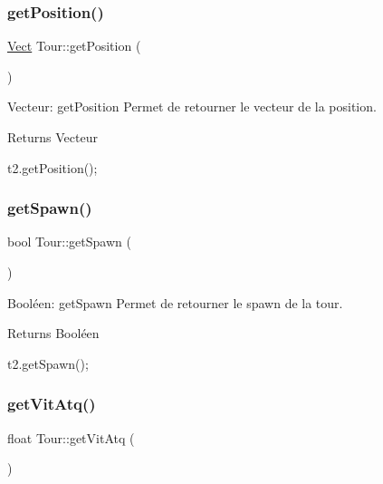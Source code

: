 \subsubsection{\texorpdfstring{get\+Position()}{getPosition()}}
{\footnotesize\ttfamily \hyperlink{classVect}{Vect} Tour\+::get\+Position (\begin{DoxyParamCaption}{ }\end{DoxyParamCaption})}



Vecteur\+: get\+Position Permet de retourner le vecteur de la position. 

\begin{DoxyReturn}{Returns}
Vecteur 
\begin{DoxyCode}
t2.getPosition();
\end{DoxyCode}
 
\end{DoxyReturn}
\mbox{\label{classTour_ae71fadbf5144610f0cc6a0e0b78386bb}} 
\subsubsection{\texorpdfstring{get\+Spawn()}{getSpawn()}}
{\footnotesize\ttfamily bool Tour\+::get\+Spawn (\begin{DoxyParamCaption}{ }\end{DoxyParamCaption})}



Booléen\+: get\+Spawn Permet de retourner le spawn de la tour. 

\begin{DoxyReturn}{Returns}
Booléen 
\begin{DoxyCode}
t2.getSpawn();
\end{DoxyCode}
 
\end{DoxyReturn}
\mbox{\label{classTour_a41fc157f749f571732100fa0daa1ad25}} 
\subsubsection{\texorpdfstring{get\+Vit\+Atq()}{getVitAtq()}}
{\footnotesize\ttfamily float Tour\+::get\+Vit\+Atq (\begin{DoxyParamCaption}{ }\end{DoxyParamCaption})}



